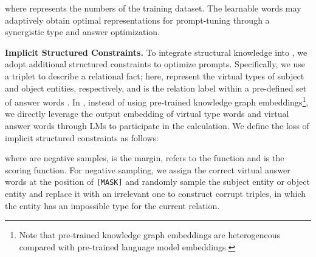 \documentclass[sigconf]{acmart}
\begin{document}
where  represents the numbers of the training dataset.
The learnable words may adaptively obtain optimal representations for prompt-tuning through a synergistic type and answer optimization.


\textbf{Implicit Structured  Constraints.}
To integrate structural knowledge into {\ours}, we adopt additional structured constraints to optimize prompts.
Specifically, we use a triplet  to describe a relational fact; here,  represent the virtual types of subject and object entities, respectively, and  is the relation label within a pre-defined set of answer words .
In {\ours}, instead of using pre-trained knowledge graph embeddings\footnote{Note that pre-trained knowledge graph embeddings are heterogeneous compared with pre-trained language model embeddings.}, we directly leverage the output embedding of virtual type words and virtual answer words through LMs to participate in the calculation.
We define the loss  of implicit structured constraints  as follows:


 

 
where  are negative samples,  is the margin,  refers to the  function and  is the scoring function. 
For negative sampling, we assign the correct virtual answer words at the position of  {\texttt{[MASK]}} and randomly sample the subject entity or object entity and replace it with an irrelevant one to construct corrupt triples, in which the entity has an impossible type for the current relation. 


\begin{table}[htbp]
\small
\center
\caption{
Statistics for RE datasets used in the paper, including numbers of relations and instances in the different split.
For dialogue-level DialogRE, instance refers to the number of documents.}
\label{tab:data_analysis} 
\end{table}
\end{document}
